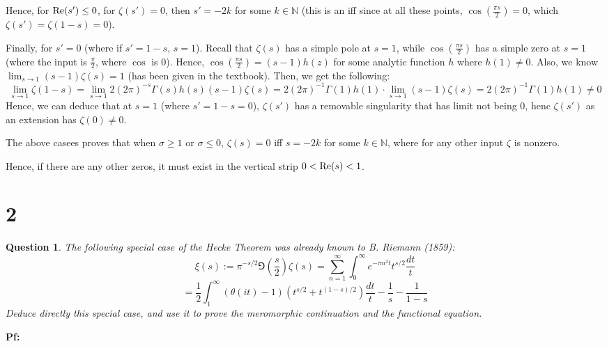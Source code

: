 \documentclass{article}
\newtheorem{question}{Question}
\begin{document}
Hence, for $\textmd{Re}(s')\leq 0$, for $\zeta(s')=0$, then $s' = -2k$ for some $k\in\mathbb{N}$ (this is an iff since at all these points, $\cos(\frac{\pi s}{2})=0$, which $\zeta(s')=\zeta(1-s)=0$).

\hfil

Finally, for $s'=0$ (where if $s'=1-s$, $s=1$). Recall that $\zeta(s)$ has a simple pole at $s=1$, while $\cos(\frac{\pi s}{2})$ has a simple zero at $s=1$ (where the input is $\frac{\pi}{2}$, where $\cos$ is $0$). Hence, $\cos(\frac{\pi s}{2}) = (s-1)h(z)$ for some analytic function $h$ where $h(1)\neq 0$. Also, we know $\lim_{s\rightarrow 1}(s-1)\zeta(s) = 1$ (has been given in the textbook). Then, we get the following:
$$\lim_{s\rightarrow 1}\zeta(1-s) = \lim_{s\rightarrow 1}2(2\pi)^{-s}\Gamma(s)h(s)(s-1)\zeta(s) = 2(2\pi)^{-1}\Gamma(1)h(1)\cdot \lim_{s\rightarrow 1}(s-1)\zeta(s) = 2(2\pi)^{-1}\Gamma(1)h(1)\neq 0$$
Hence, we can deduce that at $s=1$ (where $s'=1-s=0$), $\zeta(s')$ has a removable singularity that has limit not being $0$, henc $\zeta(s')$ as an extension has $\zeta(0)\neq 0$.

\hfil

The above casees proves that when $\sigma\geq 1$ or $\sigma\leq 0$, $\zeta(s)=0$ iff $s=-2k$ for some $k\in\mathbb{N}$, where for any other input $\zeta$ is nonzero.

Hence, if there are any other zeros, it must exist in the vertical strip $0<\textmd{Re}(s)<1$.

\break

\section*{2}
\begin{myBox}[]{}
    \begin{question}
        The following special case of the Hecke Theorem was already known to B. Riemann (1859):
        $$\xi(s):=\pi ^{-s/2}\Game\left(\frac{s}{2}\right)\zeta(s)=\sum_{n=1}^{\infty}\int_{0}^{\infty}e^{-\pi n^2t}t^{s/2}\frac{dt}{t}$$
        $$=\frac{1}{2}\int_{1}^{\infty}(\mathcal{\theta}(it)-1)(t^{s/2}+t^{(1-s)/2})\frac{dt}{t}-\frac{1}{s}-\frac{1}{1-s}$$
        Deduce directly this special case, and use it to prove the meromorphic continuation and the functional equation.
    \end{question}
\end{myBox}

\textbf{Pf:}
\end{document}
